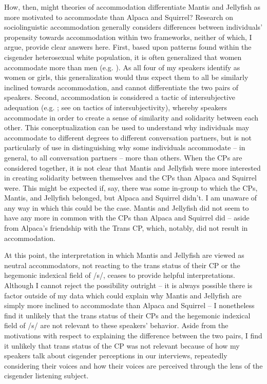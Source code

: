\documentclass[12pt,twoside]{reedthesis}
\begin{document}
How, then, might theories of accommodation differentiate Mantis and Jellyfish as more motivated to accommodate than Alpaca and Squirrel? Research on sociolinguistic accommodation generally considers differences between individuals' propensity towards accommodation within two frameworks, neither of which, I argue, provide clear answers here. First, based upon patterns found within the cisgender heterosexual white population, it is often generalized that women accommodate more than men (e.g. \cite{giles_communication_2016}). As all four of my speakers identify as women or girls, this generalization would thus expect them to all be similarly inclined towards accommodation, and cannot differentiate the two pairs of speakers.
Second, accommodation is considered a tactic of intersubjective adequation (e.g. \cite{giles_communication_2016}; see \cite{bucholtz_identity_2005} on tactics of intersubjectivity), whereby speakers accommodate in order to create a sense of similarity and solidarity between each other. This conceptualization can be used to understand why individuals may accommodate to different degrees to different conversation partners, but is not particularly of use in distinguishing why some individuals accommodate -- in general, to all conversation partners -- more than others. When the CPs are considered together, it is not clear that Mantis and Jellyfish were more interested in creating solidarity between themselves and the CPs than Alpaca and Squirrel were. This might be expected if, say, there was some in-group to which the CPs, Mantis, and Jellyfish belonged, but Alpaca and Squirrel didn't. I am unaware of any way in which this could be the case. Mantis and Jellyfish did not seem to have any more in common with the CPs than Alpaca and Squirrel did -- aside from Alpaca's friendship with the Trans CP, which, notably, did not result in accommodation.

At this point, the interpretation in which Mantis and Jellyfish are viewed as neutral accommodators, not reacting to the trans status of their CP or the hegemonic indexical field of /s/, ceases to provide helpful interpretations. Although I cannot reject the possibility outright -- it is always possible there is factor outside of my data which could explain why Mantis and Jellyfish are simply more inclined to accommodate than Alpaca and Squirrel -- I nonetheless find it unlikely that the trans status of their CPs and the hegemonic indexical field of /s/ are not relevant to these speakers' behavior. Aside from the motivations with respect to explaining the difference between the two pairs, I find it unlikely that trans status of the CP was not relevant because of how my speakers talk about cisgender perceptions in our interviews, repeatedly considering their voices and how their voices are perceived through the lens of the cisgender listening subject.
\end{document}
